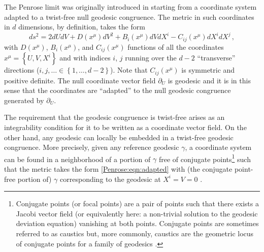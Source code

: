 The Penrose limit was originally introduced in \cite{penrose1976any} starting from a coordinate system adapted to a twist-free null geodesic congruence. The metric in such coordinates in $d$ dimensions, by definition, takes the form
\begin{equation}\label{Penrose:eqn:adapted}
ds^2 = 2 dU dV + D(x^{\mu}) dV^2 + B_i(x^{\mu}) dV dX^i - C_{ij}(x^{\mu})dX^i dX^j \, ,
\end{equation}
with $D(x^{\mu})$, $B_i(x^{\mu})$, and $C_{ij}(x^{\mu})$ functions of all the coordinates $x^{\mu} = \left\lbrace U, V, X^i \right\rbrace$ and with indices $i$, $j$ running over the $d-2$  ``transverse'' directions ($i,j, \ldots \in \left\lbrace 1, \ldots, d-2 \right \rbrace$). Note that $C_{ij}(x^{\mu})$ is symmetric and positive definite. The null coordinate vector field $\partial_U$ is geodesic and it is in this sense that the coordinates are ``adapted'' to the null geodesic congruence generated by $\partial_U$. 

The requirement that the geodesic congruence is twist-free arises as an integrability condition for it to be
written as a coordinate vector field. On the other hand, any geodesic can locally be embedded in a twist-free
geodesic congruence. More precisely, given any reference geodesic $\gamma$, a coordinate system can be found in a
neighborhood of a portion of $\gamma$ free of conjugate points\footnote{Conjugate points (or focal points) are a
pair of points such that there exists a Jacobi vector field (or equivalently here: a non-trivial solution to the
geodesic deviation equation) vanishing at both points. Conjugate points are sometimes referred to as caustics but,
more commonly, caustics are the geometric locus of conjugate points for a family of geodesics
\cite{Hawking:1973uf}.} such that the metric takes the form \eqref{Penrose:eqn:adapted} with (the conjugate
point-free portion of) $\gamma$ corresponding to the geodesic at $X^i = V = 0$ \cite{Penrose:1972ui}.

